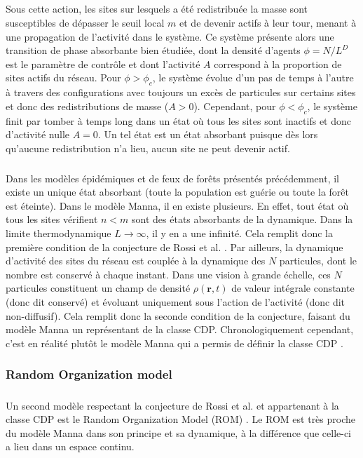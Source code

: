 \subparagraph{}Sous cette action, les sites sur lesquels a été redistribuée la masse sont susceptibles de dépasser le seuil local $m$ et de devenir actifs à leur tour, menant à une propagation de l'activité dans le système. Ce système présente alors une transition de phase absorbante bien étudiée, dont la densité d'agents $\phi = N/L^D$ est le paramètre de contrôle et dont l'activité $A$ correspond à la proportion de sites actifs du réseau. Pour $\phi > \phi_c$, le système évolue d'un pas de temps à l'autre à travers des configurations avec toujours un excès de particules sur certains sites et donc des redistributions de masse ($A>0$). Cependant, pour $\phi < \phi_c$, le système finit par tomber à temps long dans un état où tous les sites sont inactifs et donc d'activité nulle $A=0$. Un tel état est un état absorbant puisque dès lors qu'aucune redistribution n'a lieu, aucun site ne peut devenir actif. 

\subparagraph{}Dans les modèles épidémiques et de feux de forêts présentés précédemment, il existe un unique état absorbant (toute la population est guérie ou toute la forêt est éteinte). Dans le modèle Manna, il en existe plusieurs. En effet, tout état où tous les sites vérifient $n<m$ sont des états absorbants de la dynamique. Dans la limite thermodynamique $L\rightarrow \infty$, il y en a une infinité. Cela remplit donc la première condition de la conjecture de Rossi et al. \cite{rossi_universality_2000}. Par ailleurs, la dynamique d'activité des sites du réseau est couplée à la dynamique des $N$ particules, dont le nombre est conservé à chaque instant. Dans une vision à grande échelle, ces $N$ particules constituent un champ de densité $\rho (\mathbf{r}, t)$ de valeur intégrale constante (donc dit conservé) et évoluant uniquement sous l'action de l'activité (donc dit non-diffusif). Cela remplit donc la seconde condition de la conjecture, faisant du modèle Manna un représentant de la classe CDP. Chronologiquement cependant, c'est en réalité plutôt le modèle Manna qui a permis de définir la classe CDP \cite{lubeck_universal_2004}.

\subsubsection{Random Organization model}

\subparagraph{}Un second modèle respectant la conjecture de Rossi et al. \cite{rossi_universality_2000} et appartenant à la classe CDP est le Random Organization Model (ROM) \cite{corte_random_2008, tjhung_criticality_2016}. Le ROM est très proche du modèle Manna dans son principe et sa dynamique, à la différence que celle-ci a lieu dans un espace continu.

